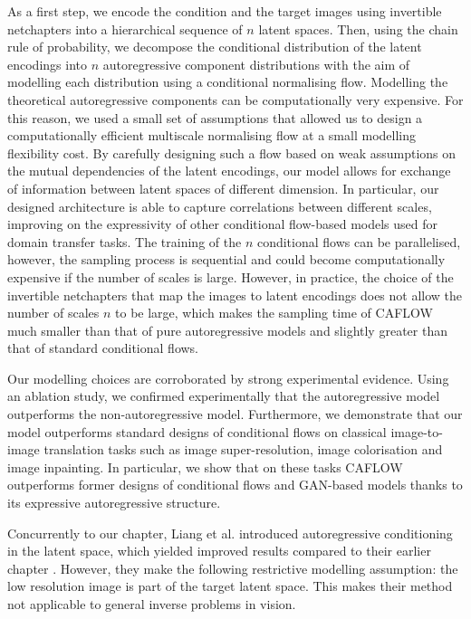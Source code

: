 As a first step, we encode the condition and the target images using invertible netchapters into a hierarchical sequence of $n$ latent spaces. Then, using the chain rule of probability, we decompose the conditional distribution of the latent encodings into $n$ autoregressive component distributions with the aim of modelling each distribution using a conditional normalising flow. Modelling the theoretical autoregressive components can be computationally very expensive. For this reason, we used a small set of assumptions that allowed us to design a computationally efficient multiscale normalising flow at a small modelling flexibility cost. By carefully designing such a flow based on weak assumptions on the mutual dependencies of the latent encodings, our model allows for exchange of information between latent spaces of different dimension. In particular, our designed architecture is able to capture correlations between different scales, improving on the expressivity of other conditional flow-based models used for domain transfer tasks. The training of the $n$ conditional flows can be parallelised, however, the sampling process is sequential and could become computationally expensive if the number of scales is large. However, in practice, the choice of the invertible netchapters that map the images to latent encodings does not allow the number of scales $n$ to be large, which makes the sampling time of CAFLOW much smaller than that of pure autoregressive models and slightly greater than that of standard conditional flows.

Our modelling choices are corroborated by strong experimental evidence. Using an ablation study, we confirmed experimentally that the autoregressive model outperforms the non-autoregressive model. Furthermore, we demonstrate that our model outperforms standard designs of conditional flows on classical image-to-image translation tasks such as image super-resolution, image colorisation and image inpainting. In particular, we show that on these tasks CAFLOW outperforms former designs of conditional flows and GAN-based models thanks to its expressive autoregressive structure.

Concurrently to our chapter, Liang et al. \cite{HCFLOW} introduced autoregressive conditioning in the latent space, which yielded improved results compared to their earlier chapter \cite{SRFLOW}. 
However, they make the following restrictive modelling assumption: the low resolution image is part of the target latent space.  This makes their method not applicable to general inverse problems in vision. 

